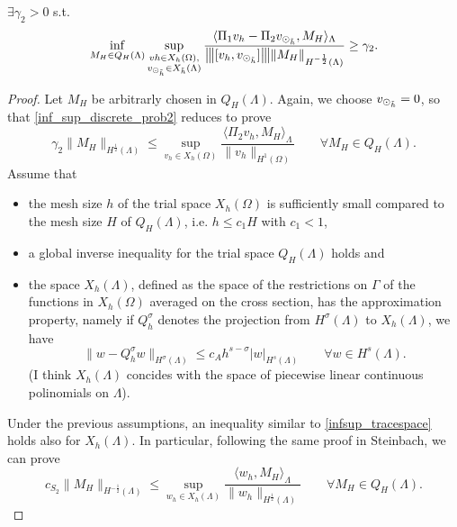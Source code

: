 \begin{theorem}
$\exists \gamma _2 >0$ s.t.
\begin{equation}\label{inf_sup_discrete_prob2}
\inf_{M_H \in Q_H(\Lambda)} 
\sup_{\substack{vh \in X_h(\Omega),\\ \vdh \in X_{\tilde{h}}(\Lambda)} }\frac{\langle \Pi_1 v_h - \Pi_2 \vdh, M_H \rangle _{\Lambda} } {\vertiii{[v_h, \vdh]} \|M_H\|_{H^{-\frac 12 }(\Lambda)}  } 
\geq \gamma _2. 
\end{equation}
\end{theorem}
\begin{proof}
Let $M_H$ be arbitrarly chosen in $Q_H(\Lambda)$. Again, we choose $v_{\odot_{\tilde{h}}} =0$, so that \eqref{inf_sup_discrete_prob2} reduces to prove
\begin{equation*}
\gamma _2 \|M_H\|_{H^{\frac 12}(\Lambda)}
\leq 
\sup_{v_h \in X_h(\Omega)} \frac{ \langle \Pi_2 v_h , M_H \rangle _{\Lambda} } {\|v_h\|_{H^1(\Omega)} } \qquad \forall M_H \in Q_H(\Lambda).
\end{equation*}
Assume that
\begin{itemize}
\item the mesh size $h$ of the trial space $X_h(\Omega)$ is sufficiently small compared to the mesh size $H$ of $Q_H(\Lambda)$, i.e. $h \leq c_1 H$ with $c_1 < 1$,
\item a global inverse inequality for the trial space $Q_H(\Lambda)$ holds and
\item the space $X_h(\Lambda)$, defined as the space of the restrictions on $\Gamma$ of the functions in $X_h(\Omega)$ averaged on the cross section, has the approximation property, namely if $Q_h^{\sigma}$ denotes the projection from $H^\sigma (\Lambda)$ to $X_h(\Lambda)$, we have
\begin{equation*}
\|w-Q_h^{\sigma} w\|_{H^{\sigma} (\Lambda)} \leq c_A h^{s-\sigma} |w|_{H^s(\Lambda)} \qquad \forall w \in H^s(\Lambda).
\end{equation*}
(I think $X_h(\Lambda)$ concides with the space of piecewise linear continuous polinomials on $\Lambda$).
\end{itemize}
Under the previous assumptions, an inequality similar to \eqref{infsup_tracespace} holds also for $X_h(\Lambda)$. In particular, following the same proof in Steinbach, we can prove 
\begin{equation}
c_{S_2} \|M_H\|_{H^{-\frac 12}(\Lambda)} \leq 
\sup_{w_h \in X_h(\Lambda)} \frac{ \langle w_h, M_H \rangle _{\Lambda} } {\|w_h\|_{H^{\frac 12}(\Lambda)}} \qquad \forall M_H \in Q_H(\Lambda).
\end{equation}

\end{proof}
